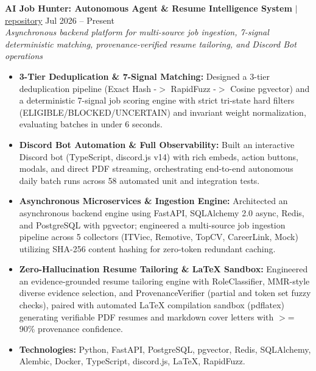 \documentclass[10pt,a4paper]{article}
\begin{document}
\noindent \textbf{AI Job Hunter: Autonomous Agent \& Resume Intelligence System} $|$ \href{https://github.com/vyquochuy/Discord-Job-hunt}{repository} \hfill Jul 2026 -- Present\\
\textit{Asynchronous backend platform for multi-source job ingestion, 7-signal deterministic matching, provenance-verified resume tailoring, and Discord Bot operations}
\begin{itemize}[leftmargin=0.25in, nosep]
    \item \textbf{3-Tier Deduplication \& 7-Signal Matching:} Designed a 3-tier deduplication pipeline (Exact Hash -$>$ RapidFuzz -$>$ Cosine pgvector) and a deterministic 7-signal job scoring engine with strict tri-state hard filters (ELIGIBLE/BLOCKED/UNCERTAIN) and invariant weight normalization, evaluating batches in under 6 seconds.
    \item \textbf{Discord Bot Automation \& Full Observability:} Built an interactive Discord bot (TypeScript, discord.js v14) with rich embeds, action buttons, modals, and direct PDF streaming, orchestrating end-to-end autonomous daily batch runs across 58 automated unit and integration tests.
    \item \textbf{Asynchronous Microservices \& Ingestion Engine:} Architected an asynchronous backend engine using FastAPI, SQLAlchemy 2.0 async, Redis, and PostgreSQL with pgvector; engineered a multi-source job ingestion pipeline across 5 collectors (ITViec, Remotive, TopCV, CareerLink, Mock) utilizing SHA-256 content hashing for zero-token redundant caching.
    \item \textbf{Zero-Hallucination Resume Tailoring \& LaTeX Sandbox:} Engineered an evidence-grounded resume tailoring engine with RoleClassifier, MMR-style diverse evidence selection, and ProvenanceVerifier (partial and token set fuzzy checks), paired with automated LaTeX compilation sandbox (pdflatex) generating verifiable PDF resumes and markdown cover letters with $>$= 90\% provenance confidence.
    \item \textbf{Technologies:} Python, FastAPI, PostgreSQL, pgvector, Redis, SQLAlchemy, Alembic, Docker, TypeScript, discord.js, LaTeX, RapidFuzz.
\end{itemize}
\vspace{10pt}
\end{document}
